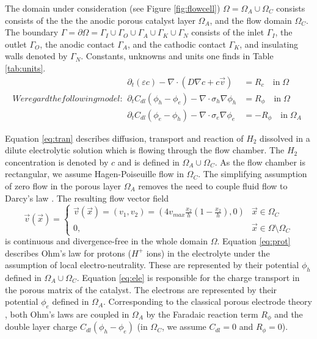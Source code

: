 \documentclass[english,nofirstpagebreak,empty]{amsproc}
\begin{document}
The  domain   under  consideration  (see   Figure  \ref{fig:flowcell})
$\Omega=\Omega_A\cup \Omega_C$ consists consists of the the the anodic
porous catalyst layer $\Omega_A$,  and the flow domain $\Omega_C$. The
boundary                    $\Gamma=\partial                   \Omega=
\Gamma_I\cup\Gamma_O\cup\Gamma_A\cup\Gamma_K\cup\Gamma_N$  consists of
the  inlet  $\Gamma_I$,  the  outlet $\Gamma_O$,  the  anodic  contact
$\Gamma_A$, and the cathodic  contact $\Gamma_K$, and insulating walls
denoted  by $\Gamma_N$.  Constants, unknowns  and units  one  finds in
Table \ref{tab:units}.
\begin{subequations}
We regard the following model:
  \begin{align}
  \partial_t (\varepsilon c) - \nabla\cdot (D\nabla c + c \vec v) 
               & = R_c \quad\text{in}\; \Omega \label{eq:tran}\\
 \partial_t C_{dl}(\phi_h-\phi_e) - \nabla\cdot \sigma_h\nabla\phi_h
                    &=R_\phi\quad\text{in}\; \Omega \label{eq:prot}\\
 \partial_t C_{dl}(\phi_e-\phi_h) - \nabla\cdot \sigma_e\nabla\phi_e
                           &=-R_\phi\quad\text{in}\; \Omega_A
\label{eq:ele}
  \end{align}
\end{subequations}

Equation \eqref{eq:tran} describes  diffusion, transport and reaction
of $H_2$ dissolved in a  dilute electrolytic solution which is flowing
through the flow chamber. The $H_2$ concentration is denoted by $c$ and
is  defined  in  $\Omega_A\cup  \Omega_C$.   As the  flow  chamber  is
rectangular,  we  assume  Hagen-Poiseuille  flow in  $\Omega_C$.   The
simplifying  assumption of zero  flow in  the porous  layer $\Omega_A$
removes   the   need   to   couple   fluid   flow   to   Darcy's   law
\cite{FuhrmannZhaoHolzbecherLangmach2008}.  The  resulting flow vector
field
\begin{equation} 
 \vec v(\vec x)= 
\begin{cases}
     \vec v(\vec x)=(v_1, v_2)=(4v_{max}\frac{x_2}{h}(1-\frac{x_2}{h}),0) & \vec x \in \Omega_C\\
     0 ,&  \vec x \in \Omega\setminus\Omega_C
  \end{cases}
\end{equation} is  continuous and divergence-free in  the whole domain
$\Omega$.   Equation \eqref{eq:prot} describes  Ohm's law  for protons
($H^+$  ions)  in  the  electrolyte  under  the  assumption  of  local
electro-neutrality.  These  are represented by  their potential $\phi_h$
defined  in  $\Omega_A\cup  \Omega_C$.   Equation  \eqref{eq:ele}  is
responsible  for the  charge transport  in  the porous  matrix of  the
catalyst.  The  electrons are represented by  their potential $\phi_e$
defined  in   $\Omega_A$.   Corresponding  to   the  classical  porous
electrode theory  \cite{Newman+ThomasAlyea-2004}, both Ohm's  laws are
coupled in $\Omega_A$  by the Faradaic reaction term  $R_\phi$ and the
double layer charge  $C_{dl}(\phi_h-\phi_e)$ (in $\Omega_C$, we assume
$C_{dl}=0$ and $R_\phi=0$).
\end{document}

